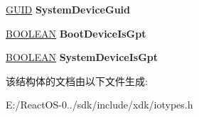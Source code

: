 \begin{DoxyCompactItemize}
\hyperlink{interface_g_u_i_d}{G\+U\+ID} {\bfseries System\+Device\+Guid}
\item 
\mbox{\label{struct___b_o_o_t_d_i_s_k___i_n_f_o_r_m_a_t_i_o_n___e_x_ac32b505ce161e4677e071cdf253db407}} 
\hyperlink{_processor_bind_8h_a112e3146cb38b6ee95e64d85842e380a}{B\+O\+O\+L\+E\+AN} {\bfseries Boot\+Device\+Is\+Gpt}
\item 
\mbox{\label{struct___b_o_o_t_d_i_s_k___i_n_f_o_r_m_a_t_i_o_n___e_x_a1dd02acd1a7f2a88a005239b6051cb2d}} 
\hyperlink{_processor_bind_8h_a112e3146cb38b6ee95e64d85842e380a}{B\+O\+O\+L\+E\+AN} {\bfseries System\+Device\+Is\+Gpt}
\end{DoxyCompactItemize}


该结构体的文档由以下文件生成\+:\begin{DoxyCompactItemize}
\item 
E\+:/\+React\+O\+S-\/0../sdk/include/xdk/iotypes.\+h\end{DoxyCompactItemize}

